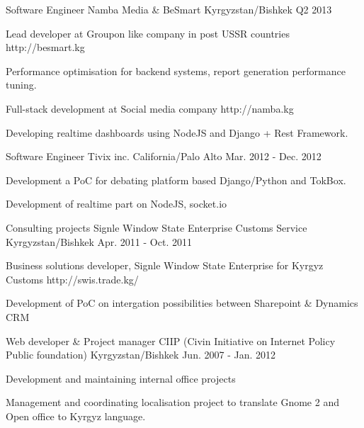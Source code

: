 \begin{cventries}
{\begin{cvitems}
      \end{cvitems}
    }
  \cventry
    {Software Engineer}
    {Namba Media \& BeSmart}
    {Kyrgyzstan/Bishkek}
    {Q2 2013}
    {
      \begin{cvitems}
        \item {Lead developer at Groupon like company in post USSR countries http://besmart.kg}
        \item {Performance optimisation for backend systems, report generation performance tuning.}
        \item {Full-stack development at Social media company http://namba.kg}
        \item {Developing realtime dashboards using NodeJS and Django + Rest Framework.}
      \end{cvitems}
    }
  \cventry
    {Software Engineer}
    {Tivix inc.}
    {California/Palo Alto}
    {Mar. 2012 - Dec. 2012}
    {
      \begin{cvitems}
        \item {Development a PoC for debating platform based Django/Python and TokBox.}
        \item {Development of realtime part on NodeJS, socket.io}
      \end{cvitems}
    }
  \cventry
    {Consulting projects}
    {Signle Window State Enterprise Customs Service}
    {Kyrgyzstan/Bishkek}
    {Apr. 2011 - Oct. 2011}
    {
      \begin{cvitems}
        \item {Business solutions developer, Signle Window State Enterprise for Kyrgyz Customs http://swis.trade.kg/}
        \item {Development of PoC on intergation possibilities between Sharepoint \& Dynamics CRM}
      \end{cvitems}
    }

  \cventry
    {Web developer \& Project manager}
    {CIIP (Civin Initiative on Internet Policy Public foundation)}
    {Kyrgyzstan/Bishkek}
    {Jun. 2007 - Jan. 2012}
    {
      \begin{cvitems}
        \item {Development and maintaining internal office projects}
        \item {Management and coordinating localisation project to translate Gnome 2 and Open office to Kyrgyz language.}
      \end{cvitems}
    }
\end{cventries}
